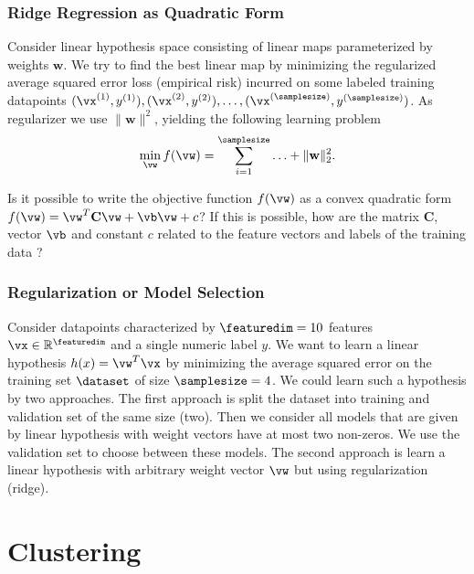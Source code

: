 \documentclass[12pt]{report}
\newcommand{\featurelen}{\featuredim}
\begin{document}
\subsection{Ridge Regression as Quadratic Form} 
\label{ex_2_0}
Consider linear hypothesis space consisting of linear maps parameterized by 
weights $\mathbf{w}$. We try to find the best linear map by minimizing the regularized average 
squared error loss (empirical risk) incurred on some labeled training datapoints 
$(\vx^{(1)},y^{(1)}),(\vx^{(2)},y^{(2)}),\ldots,(\vx^{(\samplesize)},y^{(\samplesize)})$. 
As regularizer we use $\| \mathbf{w} \|^{2}$, yielding the following learning problem 
$$ \min_{\vw} f(\vw) = \sum_{i=1}^{\samplesize}\ldots + \| \mathbf{w} \|^{2}_{2}.$$

Is it possible to write the objective function $f(\vw)$ as a convex quadratic form 
$f(\vw) = \vw^{T} \mathbf{C} \vw + \vb \vw + c$? If this is possible, how are the 
matrix $\mathbf{C}$, vector $\vb$ and constant $c$ related to the feature vectors 
and labels of the training data ? 

\subsection{Regularization or Model Selection} 
Consider datapoints characterized by $\featurelen=10$ features $\vx \in \mathbb{R}^{\featurelen}$ 
and a single numeric label $y$. We want to learn a linear hypothesis $h(x) = \vw^{T} \vx$ by 
minimizing the average squared error on the training set $\dataset$ of size $\samplesize=4$. 
We could learn such a hypothesis by two approaches. The first approach is split the dataset 
into training and validation set of the same size (two). Then we consider all models that are given by 
linear hypothesis with weight vectors have at most two non-zeros. We use the validation 
set to choose between these models. The second approach is learn a linear hypothesis 
with arbitrary weight vector $\vw$ but using regularization (ridge). 



\newpage
\chapter{Clustering} 
\label{ch_Clustering}
\end{document}
